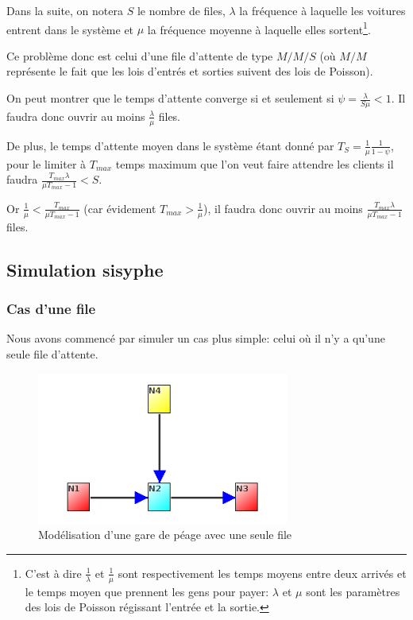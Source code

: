 \documentclass{scrartcl}
\begin{document}
  Dans la suite, on notera $S$ le nombre de files, $\lambda$ la fréquence à
  laquelle les voitures entrent dans le système et $\mu$ la fréquence moyenne à
  laquelle elles sortent\footnote{C'est à dire $\frac 1 \lambda$ et
  $\frac 1 \mu$ sont respectivement les temps moyens entre deux arrivés et le
  temps moyen que prennent les gens pour payer: $\lambda$ et $\mu$ sont les
  paramètres des lois de Poisson régissant l'entrée et la sortie.}.

  Ce problème donc est celui d'une file d'attente de type $M/M/S$ (où $M/M$
  représente le fait que les lois d'entrés et sorties suivent des lois de
  Poisson).

    On peut montrer que le temps d'attente converge si et seulement si $\psi =
    \frac \lambda {S\mu} < 1$. Il faudra donc ouvrir au moins $\frac \lambda
    \mu$ files.

    De plus, le temps d'attente moyen dans le système étant donné par $T_S =
    \frac 1 \mu \frac 1 {1-\psi}$, pour le limiter à $T_{max}$ temps maximum
    que l'on veut faire attendre les clients il faudra $\frac
    {T_{max}\lambda}{\mu T_{max}-1} < S$.

    Or $\frac 1 \mu < \frac{T_{max}}{\mu T_{max}-1}$ (car évidement $T_{max} >
    \frac 1 \mu$), il faudra donc ouvrir au moins $\frac{T_{max}\lambda}{\mu
    T_{max}-1}$ files.

  \subsection{Simulation sisyphe}
    \subsubsection{Cas d'une file}
      Nous avons commencé par simuler un cas plus simple: celui où il n'y a
      qu'une seule file d'attente.

      \begin{figure}[htbp]
        \centering
        \includegraphics[height=5cm]{img/poisson_simple.png}
        \caption{Modélisation d'une gare de péage avec une seule file}
        \label{figure:syphilis_simple}
      \end{figure}
\end{document}
